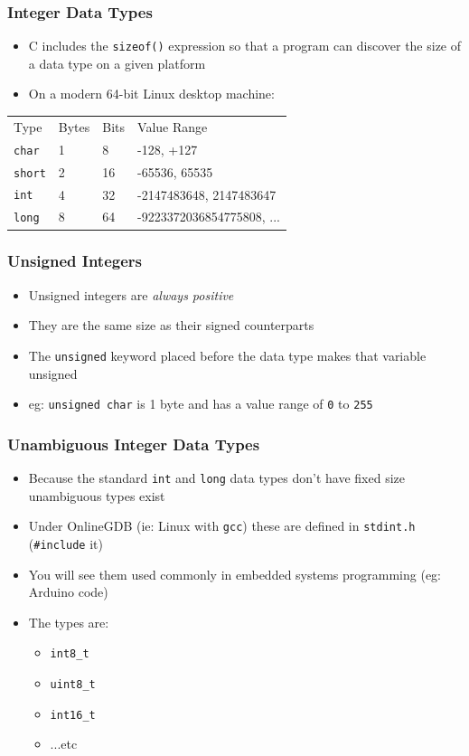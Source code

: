 \documentclass[14pt]{beamer}
\begin{document}
\begin{frame}
\frametitle{Integer Data Types}
\begin{itemize}
\item C includes the \texttt{sizeof()} expression so that a program can discover the size of a data type on a given platform
\item On a modern 64-bit Linux desktop machine:
\end{itemize}
\begin{table}[]
\begin{tabular}{llll}
Type & Bytes & Bits & Value Range                               \\
\texttt{char}      & 1            & 8           & -128, +127                                \\
\texttt{short}     & 2            & 16          & -65536, 65535                             \\
\texttt{int}       & 4            & 32          & -2147483648, 2147483647                   \\
\texttt{long}      & 8            & 64          & -9223372036854775808, ...
\end{tabular}
\end{table}
\end{frame}

\begin{frame}
\frametitle{Unsigned Integers}
\begin{itemize}
\item Unsigned integers are \textit{always positive}
\item They are the same size as their signed counterparts
\item The \texttt{unsigned} keyword placed before the data type makes that variable unsigned
\item eg: \texttt{unsigned char} is 1 byte and has a value range of \texttt{0} to \texttt{255}
\end{itemize}
\end{frame}

\begin{frame}
\frametitle{Unambiguous Integer Data Types}
\begin{itemize}
\item Because the standard \texttt{int} and \texttt{long} data types don't have fixed size unambiguous types exist
\item Under OnlineGDB (ie: Linux with \texttt{gcc}) these are defined in \texttt{stdint.h} (\texttt{\#include} it)
\item You will see them used commonly in embedded systems programming (eg: Arduino code)
\item The types are:
	\begin{itemize}
		\item \texttt{int8\_t}
		\item \texttt{uint8\_t}
		\item \texttt{int16\_t}
		\item ...etc
	\end{itemize}
\end{itemize}
\end{frame}
\end{document}
